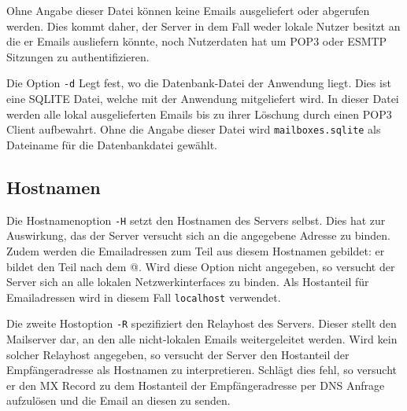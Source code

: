 \documentclass[final,a4paper,11pt,notitlepage,halfparskip]{scrreprt}
\begin{document}
Ohne Angabe dieser Datei können keine Emails ausgeliefert oder abgerufen werden.
Dies kommt daher, der Server in dem Fall weder lokale Nutzer besitzt an die er
Emails ausliefern könnte, noch Nutzerdaten hat um POP3 oder ESMTP Sitzungen zu
authentifizieren.

Die Option \texttt{-d} Legt fest, wo die Datenbank-Datei der Anwendung liegt.
Dies ist eine SQLITE Datei, welche mit der Anwendung mitgeliefert wird. In
dieser Datei werden alle lokal ausgelieferten Emails bis zu ihrer Löschung durch
einen POP3 Client aufbewahrt. Ohne die Angabe dieser Datei wird
\texttt{mailboxes.sqlite} als Dateiname für die Datenbankdatei gewählt.


\subsection{Hostnamen}
Die Hostnamenoption \texttt{-H} setzt den Hostnamen des Servers selbst. Dies hat
zur Auswirkung, das der Server versucht sich an die angegebene Adresse zu
binden. Zudem werden die Emailadressen zum Teil aus diesem Hostnamen gebildet:
er bildet den Teil nach dem @. Wird diese Option nicht angegeben, so versucht
der Server sich an alle lokalen Netzwerkinterfaces zu binden. Als Hostanteil für
Emailadressen wird in diesem Fall \texttt{localhost} verwendet.

Die zweite Hostoption \texttt{-R} spezifiziert den Relayhost des Servers. Dieser
stellt den Mailserver dar, an den alle nicht-lokalen Emails weitergeleitet
werden. Wird kein solcher Relayhost angegeben, so versucht der Server den
Hostanteil der Empfängeradresse als Hostnamen zu interpretieren. Schlägt dies
fehl, so versucht er den MX Record zu dem Hostanteil der Empfängeradresse per 
DNS Anfrage aufzulösen und die Email an diesen zu senden.


\pagebreak
\end{document}
